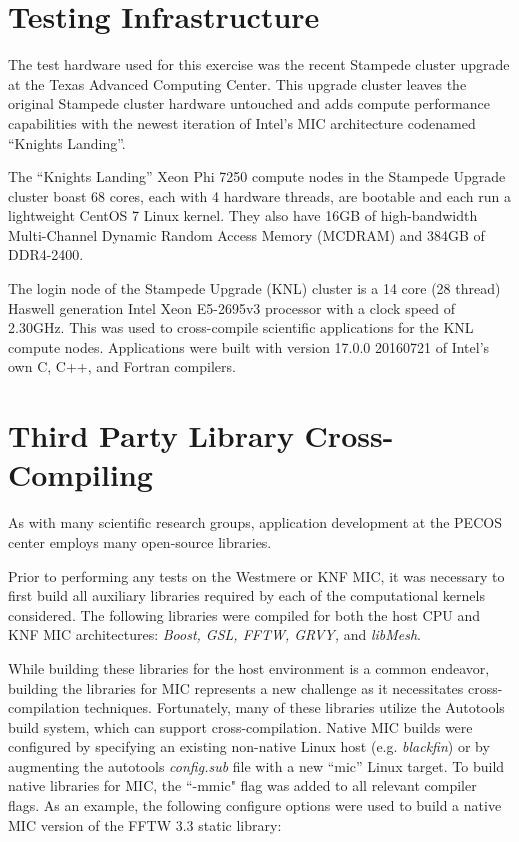 \section{Testing Infrastructure}
\label{sec:hardware}

The test hardware used for this exercise was the recent Stampede cluster
upgrade at the Texas Advanced Computing Center.  This upgrade cluster leaves
the original Stampede cluster hardware untouched and adds compute performance
capabilities with the newest iteration of Intel's MIC architecture codenamed
``Knights Landing''.

The ``Knights Landing'' Xeon Phi 7250 compute nodes in the Stampede Upgrade
cluster boast 68 cores, each with 4 hardware threads, are bootable and each run
a lightweight CentOS 7 Linux kernel.  They also have 16GB of high-bandwidth
Multi-Channel Dynamic Random Access Memory (MCDRAM) and 384GB of DDR4-2400.

The login node of the Stampede Upgrade (KNL) cluster is a 14 core (28 thread)
Haswell generation Intel Xeon E5-2695v3 processor with a clock speed of
2.30GHz.  This was used to cross-compile scientific applications for the KNL
compute nodes.  Applications were built with version 17.0.0 20160721 of Intel's
own C, C++, and Fortran compilers.

\section{Third Party Library Cross-Compiling} \label{sec:cross_compile}

As with many scientific research groups, application development at
the PECOS center employs many open-source libraries.

Prior to
performing any tests on the Westmere or KNF MIC, it was necessary to
first build all auxiliary libraries required by each of the
computational kernels considered.
The following libraries were
compiled for both the host CPU and KNF MIC architectures: {\em Boost,
GSL, FFTW\cite{FFTW05}, GRVY,} and
{\em libMesh}.

While building these libraries for the host environment is
a common endeavor, building the libraries for MIC
represents a new challenge as it necessitates cross-compilation
techniques.
Fortunately, many of these libraries utilize the
Autotools build system, which can support cross-compilation.
Native MIC builds were configured by
specifying an existing non-native Linux host
(e.g. {\em blackfin}) or by augmenting the autotools {\em config.sub}
file with a new ``mic'' Linux target.
To build native libraries for MIC, the ``-mmic"
flag was added to all relevant compiler flags.
As an example, the following configure options were used to build a
native MIC version of the FFTW 3.3 static library:

